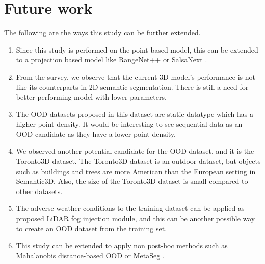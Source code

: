     \section{Future work}
    The following are the ways this study can be further extended.
    \begin{enumerate}
        \item Since this study is performed on the point-based model, this can be extended to a projection based model like RangeNet++ \cite{Hu_2020_CVPR_Randla} or SalsaNext \cite{SalsaNext_2020}.
        \item From the survey, we observe that the current 3D model's performance is not like its counterparts in 2D semantic segmentation. There is still a need for better performing model with lower parameters.
        \item The OOD datasets proposed in this dataset are static datatype which has a higher point density. It would be interesting to see sequential data as an OOD candidate as they have a lower point density.
        \item We observed another potential candidate for the OOD dataset, and it is the Toronto3D dataset. The Toronto3D dataset is an outdoor dataset, but objects such as buildings and trees are more American than the European setting in Semantic3D. Also, the size of the Toronto3D dataset is small compared to other datasets.
        \item The adverse weather conditions to the training dataset can be applied as \cite{fogsim} proposed LiDAR fog injection module, and this can be another possible way to create an OOD dataset from the training set.
        \item This study can be extended to apply non post-hoc methods such as Mahalanobis distance-based OOD \cite{lee2018simple_mahalanobis} or MetaSeg \cite{MetaSeg}.
    \end{enumerate}

